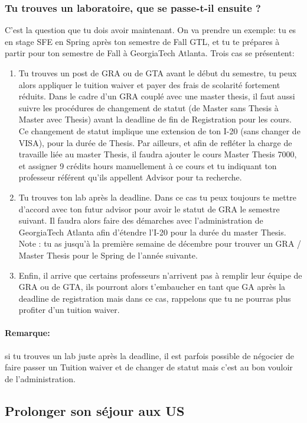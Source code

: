 \documentclass{article}
\begin{document}
\subsubsection{Tu trouves un laboratoire, que se passe-t-il ensuite ?}
C'est la question que tu dois avoir maintenant. On va prendre un exemple: tu es en stage SFE en Spring après ton semestre de Fall GTL, et tu te prépares à partir pour ton semestre de Fall à GeorgiaTech Atlanta. Trois cas se présentent: 
\begin{enumerate}
\item Tu trouves un post de GRA ou de GTA avant le début du semestre, tu peux alors appliquer le tuition waiver et payer des frais de scolarité fortement réduits. Dans le cadre d'un GRA couplé avec une master thesis, il faut aussi suivre les procédures de changement de statut (de Master sans Thesis à Master avec Thesis) avant la deadline de fin de Registration pour les cours. Ce changement de statut implique une extension de ton I-20 (sans changer de VISA), pour la durée de Thesis. Par ailleurs, et afin de refléter la charge de travaille liée au master Thesis, il faudra ajouter le cours Master Thesis 7000, et assigner 9 crédits hours manuellement à ce cours et tu indiquant ton professeur référent qu'ils appellent Advisor pour ta recherche.
\item Tu trouves ton lab après la deadline. Dans ce cas tu peux toujours te mettre d'accord avec ton futur advisor pour avoir le statut de GRA le semestre suivant. Il faudra alors faire des démarches avec l'administration de GeorgiaTech Atlanta afin d'étendre l'I-20 pour la durée du master Thesis. 
Note : tu as jusqu'à la première semaine de décembre pour trouver un GRA / Master Thesis pour le Spring de l'année suivante.
\item Enfin, il arrive que certains professeurs n'arrivent pas à remplir leur équipe de GRA ou de GTA, ils pourront alors t'embaucher en tant que GA après la deadline de registration mais dans ce cas, rappelons que tu ne pourras plus profiter d'un tuition waiver. 
 \end{enumerate}

\paragraph{Remarque: }si tu trouves un lab juste après la deadline, il est parfois possible de négocier de faire passer un Tuition waiver et de changer de statut mais c'est au bon vouloir de l'administration. 

\subsection{Prolonger son séjour aux US }
\end{document}
